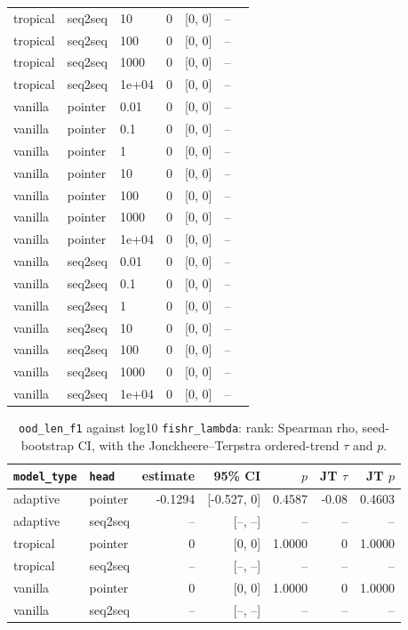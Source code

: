 \documentclass[10pt]{article}
\begin{document}
{\begin{longtable}{lllrrrl}
tropical & seq2seq & 10 & 0 & [0, 0] & -- & \\
tropical & seq2seq & 100 & 0 & [0, 0] & -- & \\
tropical & seq2seq & 1000 & 0 & [0, 0] & -- & \\
tropical & seq2seq & 1e+04 & 0 & [0, 0] & -- & \\
vanilla & pointer & 0.01 & 0 & [0, 0] & -- & \\
vanilla & pointer & 0.1 & 0 & [0, 0] & -- & \\
vanilla & pointer & 1 & 0 & [0, 0] & -- & \\
vanilla & pointer & 10 & 0 & [0, 0] & -- & \\
vanilla & pointer & 100 & 0 & [0, 0] & -- & \\
vanilla & pointer & 1000 & 0 & [0, 0] & -- & \\
vanilla & pointer & 1e+04 & 0 & [0, 0] & -- & \\
vanilla & seq2seq & 0.01 & 0 & [0, 0] & -- & \\
vanilla & seq2seq & 0.1 & 0 & [0, 0] & -- & \\
vanilla & seq2seq & 1 & 0 & [0, 0] & -- & \\
vanilla & seq2seq & 10 & 0 & [0, 0] & -- & \\
vanilla & seq2seq & 100 & 0 & [0, 0] & -- & \\
vanilla & seq2seq & 1000 & 0 & [0, 0] & -- & \\
vanilla & seq2seq & 1e+04 & 0 & [0, 0] & -- & \\
\bottomrule
\end{longtable}
}

{\small
\begin{longtable}{llrrrrr}
\caption{\texttt{ood\_len\_f1} against log10 \texttt{fishr\_lambda}: rank: Spearman rho, seed-bootstrap CI, with the Jonckheere--Terpstra ordered-trend $\tau$ and $p$.}\label{tab:trend-ood_len_f1}\\
\toprule
\texttt{model\_type} & \texttt{head} & estimate & 95\% CI & $p$ & JT $\tau$ & JT $p$\\
\midrule
\endhead
adaptive & pointer & -0.1294 & [-0.527, 0] & 0.4587 & -0.08 & 0.4603\\
adaptive & seq2seq & -- & [--, --] & -- & -- & --\\
tropical & pointer & 0 & [0, 0] & 1.0000 & 0 & 1.0000\\
tropical & seq2seq & -- & [--, --] & -- & -- & --\\
vanilla & pointer & 0 & [0, 0] & 1.0000 & 0 & 1.0000\\
vanilla & seq2seq & -- & [--, --] & -- & -- & --\\
\bottomrule
\end{longtable}
}
\end{document}
